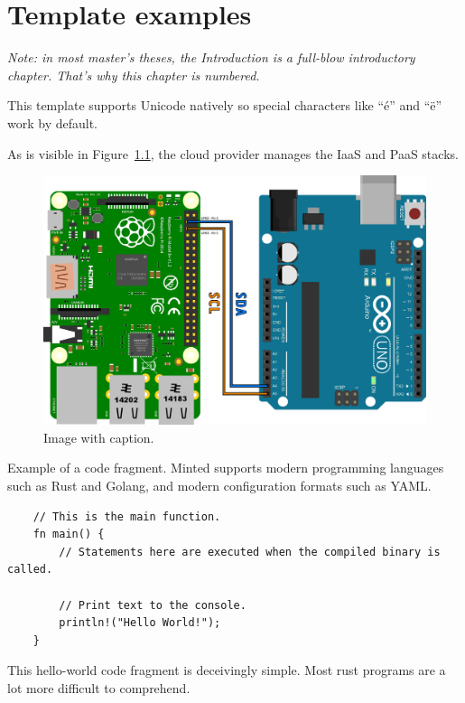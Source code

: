 \chapter{Template examples}
\label{chap:templateexamples}

\textit{Note: in most master's theses, the Introduction is a full-blow introductory chapter. That's why this chapter is numbered.}

This template supports Unicode natively so special characters like ``é'' and ``ë'' work by default.

As is visible in Figure~\ref{fig:cloud_rollen}, the cloud provider manages the IaaS and PaaS stacks.

\begin{figure}[h]
	\centering
	\includegraphics[width=\textwidth]{images/HW_config.png}
	\caption{Image with caption.}
	\label{fig:cloud_rollen}
\end{figure}

Example of a code fragment. Minted supports modern programming languages such as Rust and Golang, and modern configuration formats such as YAML.

\begin{listing}[ht]
    \begin{verbatim}
    // This is the main function.
    fn main() {
        // Statements here are executed when the compiled binary is called.
    
        // Print text to the console.
        println!("Hello World!");
    }
    \end{verbatim}
    \caption{This hello-world code fragment is deceivingly simple. Most rust programs are a lot more difficult to comprehend.}
\end{listing}



